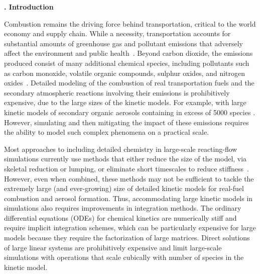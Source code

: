 \documentclass[twocolumn,10pt]{article} %
\renewcommand{\section}%
              [1]%
              {%
               \bgroup%
               \flushleft%
               \small\bf%
               \stepcounter{section}%
               \arabic{section}. #1%
               \par%
               \egroup%
              }%
\newcommand{\sectionOne}[1]{\section{#1} \addvspace{10pt}}
\begin{document}

\clearpage


\sectionOne{Introduction}

Combustion remains the driving force behind transportation, critical to the world economy and supply chain.
While a necessity, transportation accounts for substantial amounts of greenhouse gas and pollutant emissions that adversely affect the environment and public health~\cite{van_fan_review_2018, manisalidis_environmental_2020}.
Beyond carbon dioxide, the emissions produced consist of many additional chemical species, including pollutants such as carbon monoxide, volatile organic compounds, sulphur oxides, and nitrogen oxides~\cite{van_fan_review_2018}.
Detailed modeling of the combustion of real transportation fuels and the secondary atmospheric reactions involving their emissions is prohibitively expensive, due to the large sizes of the kinetic models.
For example, with large kinetic models of secondary organic aerosols containing in excess of 5000 species \cite{li_modeling_2015}.
However, simulating and then mitigating the impact of these emissions requires the ability to model such complex phenomena on a practical scale.

Most approaches to including detailed chemistry in large-scale reacting-flow simulations currently use methods that either reduce the size of the model, via skeletal reduction or lumping, or eliminate short timescales to reduce stiffness~\cite{Lu2009, Pepiot2019}.
However, even when combined, these methods may not be sufficient to tackle the extremely large (and ever-growing) size of detailed kinetic models for real-fuel combustion and aerosol formation.
Thus, accommodating large kinetic models in simulations also requires improvements in integration methods.
The ordinary differential equations (ODEs) for chemical kinetics are numerically stiff and require implicit integration schemes, which can be particularly expensive for large models because they require the factorization of large matrices.
Direct solutions of large linear systems are prohibitively expensive and limit large-scale simulations with operations that scale cubically with number of species in the kinetic model.
\end{document}
